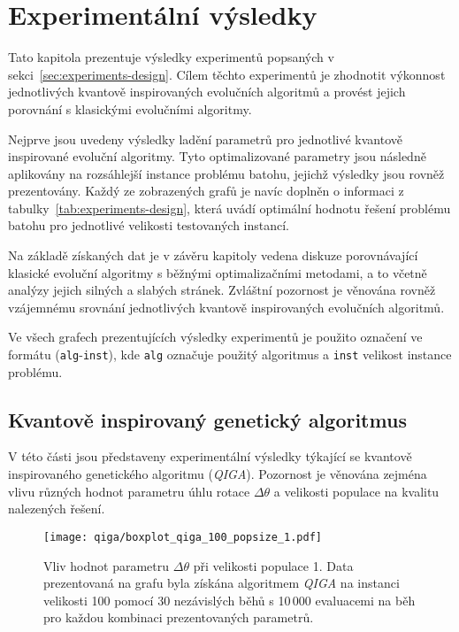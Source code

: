 \chapter{Experimentální výsledky} \label{chapt:experiments}
Tato kapitola prezentuje výsledky experimentů popsaných v sekci~\ref{sec:experiments-design}. 
Cílem těchto experimentů je zhodnotit výkonnost jednotlivých kvantově inspirovaných evolučních algoritmů a provést jejich porovnání s klasickými evolučními algoritmy. 

Nejprve jsou uvedeny výsledky ladění parametrů pro jednotlivé kvantově inspirované evoluční algoritmy. 
Tyto optimalizované parametry jsou následně aplikovány na rozsáhlejší instance problému batohu, jejichž výsledky jsou rovněž prezentovány. 
Každý ze zobrazených grafů je navíc doplněn o informaci z tabulky~\ref{tab:experiments-design}, která uvádí optimální hodnotu řešení problému batohu pro jednotlivé velikosti testovaných instancí.

Na základě získaných dat je v závěru kapitoly vedena diskuze porovnávající klasické evoluční algoritmy s běžnými optimalizačními metodami, a to včetně analýzy jejich silných a slabých stránek. 
Zvláštní pozornost je věnována rovněž vzájemnému srovnání jednotlivých kvantově inspirovaných evolučních algoritmů. 

Ve všech grafech prezentujících výsledky experimentů je použito označení ve formátu (\texttt{alg}-\texttt{inst}), kde \texttt{alg} označuje použitý algoritmus a \texttt{inst} velikost instance problému. 

\section{Kvantově inspirovaný genetický algoritmus}\label{sec:exp-qiga}
V této části jsou představeny experimentální výsledky týkající se kvantově inspirovaného genetického algoritmu (\emph{QIGA}). 
Pozornost je věnována zejména vlivu různých hodnot parametru úhlu rotace $\Delta\theta$ a velikosti populace na kvalitu nalezených řešení. 

\begin{figure}[ht!]
    \centering
    \texttt{[image: qiga/boxplot\_qiga\_100\_popsize\_1.pdf]}
    \caption{Vliv hodnot parametru $\Delta\theta$ při velikosti populace 1. Data prezentovaná na grafu byla získána algoritmem \emph{QIGA} na instanci velikosti 100 pomocí 30 nezávislých běhů s 10\,000 evaluacemi na běh pro každou kombinaci prezentovaných parametrů.}
    \label{fig:qiga-pop1}
\end{figure}


